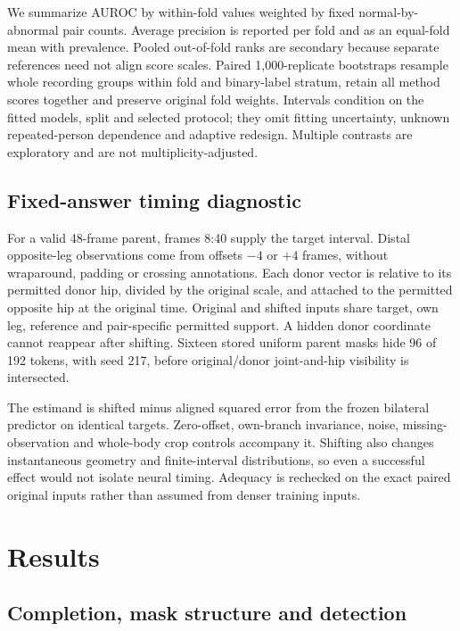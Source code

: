 \documentclass[letterpaper]{article}
\begin{document}
We summarize AUROC by within-fold values weighted by fixed normal-by-abnormal pair counts. Average precision is reported per fold and as an equal-fold mean with prevalence. Pooled out-of-fold ranks are secondary because separate references need not align score scales. Paired 1,000-replicate bootstraps resample whole recording groups within fold and binary-label stratum, retain all method scores together and preserve original fold weights. Intervals condition on the fitted models, split and selected protocol; they omit fitting uncertainty, unknown repeated-person dependence and adaptive redesign. Multiple contrasts are exploratory and are not multiplicity-adjusted.

\subsection{Fixed-answer timing diagnostic}

For a valid 48-frame parent, frames 8:40 supply the target interval. Distal opposite-leg observations come from offsets \(-4\) or \(+4\) frames, without wraparound, padding or crossing annotations. Each donor vector is relative to its permitted donor hip, divided by the original scale, and attached to the permitted opposite hip at the original time. Original and shifted inputs share target, own leg, reference and pair-specific permitted support. A hidden donor coordinate cannot reappear after shifting. Sixteen stored uniform parent masks hide 96 of 192 tokens, with seed 217, before original/donor joint-and-hip visibility is intersected.

The estimand is shifted minus aligned squared error from the frozen bilateral predictor on identical targets. Zero-offset, own-branch invariance, noise, missing-observation and whole-body crop controls accompany it. Shifting also changes instantaneous geometry and finite-interval distributions, so even a successful effect would not isolate neural timing. Adequacy is rechecked on the exact paired original inputs rather than assumed from denser training inputs.

\section{Results}

\subsection{Completion, mask structure and detection}
\end{document}
